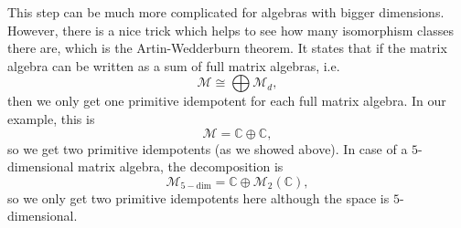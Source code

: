 This step can be much more complicated for algebras with bigger dimensions. However, there is a nice trick which helps to see how many isomorphism classes there are, which is the Artin-Wedderburn theorem. It states that if the matrix algebra can be written as a sum of full matrix algebras, i.e.
	\begin{equation}
		\mathcal{M}\cong\bigoplus\mathcal{M}_d,
	\end{equation}
then we only get one primitive idempotent for each full matrix algebra. In our example, this is 
	\begin{equation}
		\mathcal{M}=\mathbb{C}\oplus\mathbb{C},
	\end{equation}
so we get two primitive idempotents (as we showed above). In case of a $5$-dimensional matrix algebra, the decomposition is
	\begin{equation}
		\mathcal{M}_{5-\mathrm{dim}}=\mathbb{C}\oplus\mathcal{M}_2(\mathbb{C}),
	\end{equation}
so we only get two primitive idempotents here although the space is $5$-dimensional.
	
